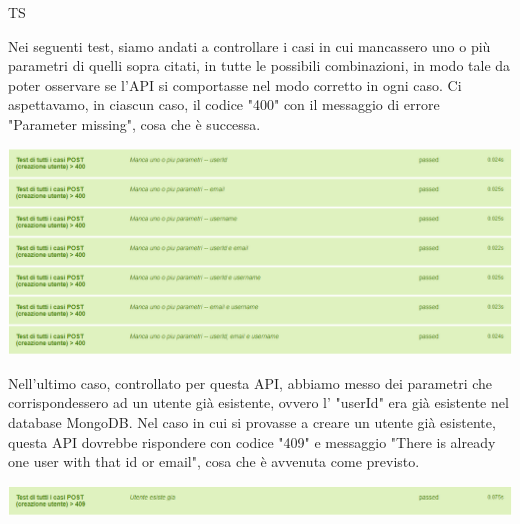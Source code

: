 \begin{listaPersonale}{TS}
\begin{center}
                \end{center}
                Nei seguenti test, siamo andati a controllare i casi in cui mancassero uno o più parametri di quelli sopra citati, in tutte le possibili combinazioni, in modo tale da poter osservare se l'API si comportasse nel modo corretto in ogni caso. Ci aspettavamo, in ciascun caso, il codice "400" con il messaggio di errore "Parameter missing", cosa che è successa.
                \begin{center}
                        \includegraphics[width=1\textwidth, height=0.27\textheight]{img/png/tests/UtentePost/400_missingParameter_PostUtente.png}
                \end{center}
                Nell'ultimo caso, controllato per questa API, abbiamo messo dei parametri che corrispondessero ad un utente già esistente, ovvero l' "userId" era già esistente nel database MongoDB. Nel caso in cui si provasse a creare un utente già esistente, questa API dovrebbe rispondere con codice "409" e messaggio "There is already one user with that id or email", cosa che è avvenuta come previsto.
                \begin{center}
                        \includegraphics[width=1\textwidth, height=0.04\textheight]{img/png/tests/UtentePost/409_postUtente.png}

\end{center}
\end{listaPersonale}
